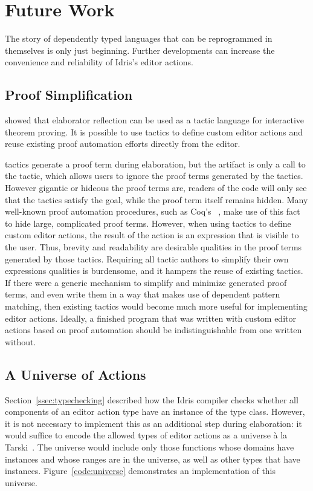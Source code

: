 \section{Future Work}

The story of dependently typed languages that can be reprogrammed in
themselves is only just beginning. Further developments can increase
the convenience and reliability of Idris's editor actions.

\subsection{Proof Simplification}
\label{sssec:simplification}

\citet{elabref} showed that elaborator reflection can be used as a
tactic language for interactive theorem proving. It is possible to use
\Elab{} tactics to define custom editor actions and reuse existing
proof automation efforts directly from the editor.

\Elab{} tactics generate a proof term during elaboration, but the
artifact is only a call to the tactic, which allows users to ignore
the proof terms generated by the tactics. However gigantic or hideous
the proof terms are, readers of the code will only see that the
tactics satisfy the goal, while the proof term
itself remains hidden. Many well-known proof automation procedures, such as Coq's
~\cite{omega}, make use of this fact to hide large, complicated proof terms.  However, when using
\Elab{} tactics to define custom editor actions, the result of the
action is an expression that is visible to the user. Thus, brevity and
readability are desirable qualities in the proof terms generated by
those tactics.  Requiring all tactic authors to simplify their own
expressions qualities is burdensome, and it hampers the reuse of
existing tactics.  If there were a generic mechanism to simplify and
minimize generated proof terms, and even write them in a way that
makes use of dependent pattern matching, then existing tactics would become
much more useful for implementing editor actions. Ideally, a finished program that was written with
custom editor actions based on proof automation should be indistinguishable from one written without.

\subsection{A Universe of Actions}
\label{sssec:universeEncoding}

Section~\ref{ssec:typechecking} described how the Idris compiler
checks whether all components of an editor action type have an
instance of the \Editorable{} type class. However, it is not necessary
to implement this as an additional step during elaboration: it would suffice to
encode the allowed types of editor actions as a universe à la
Tarski~\cite{genericDep}.  The universe would include only those functions whose domains
have \Editorable{} instances and whose ranges are in the universe, as well as
other types that have \Editorable{} instances.
Figure~\ref{code:universe} demonstrates an implementation of this universe.


